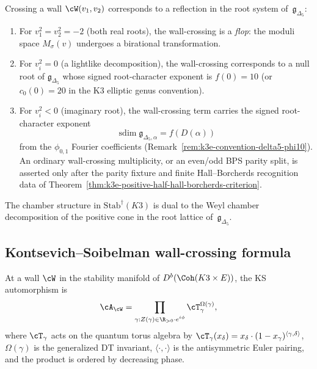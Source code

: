 \begin{proposition}
\label{prop:k3e-walls-roots}
Crossing a wall $\cW(v_1, v_2)$ corresponds to a reflection in the root system of~$\mathfrak{g}_{\Delta_5}$:
\begin{enumerate}[label=(\roman*)]
 \item For $v_1^2 = v_2^2 = -2$ (both real roots), the wall-crossing is a \emph{flop}: the moduli space $M_\sigma(v)$ undergoes a birational transformation.
 \item For $v_i^2 = 0$ (a lightlike decomposition), the wall-crossing corresponds to a null root of $\mathfrak{g}_{\Delta_5}$ whose signed root-character exponent is $f(0) = 10$ (or $c_0(0) = 20$ in the K3 elliptic genus convention).
 \item For $v_i^2 < 0$ (imaginary root), the wall-crossing term carries the signed root-character exponent
\[
\operatorname{sdim}\mathfrak g_{\Delta_5,\alpha}=f(D(\alpha))
\]
from the $\phi_{0,1}$ Fourier coefficients (Remark~\ref{rem:k3e-convention-delta5-phi10}). An ordinary wall-crossing multiplicity, or an even/odd BPS parity split, is asserted only after the parity fixture and finite Hall--Borcherds recognition data of Theorem~\ref{thm:k3e-positive-half-hall-borcherds-criterion}.
\end{enumerate}
The chamber structure in $\mathrm{Stab}^\dagger(K3)$ is dual to the Weyl chamber decomposition of the positive cone in the root lattice of~$\mathfrak{g}_{\Delta_5}$.
\end{proposition}

\subsection{Kontsevich--Soibelman wall-crossing formula}
\label{subsec:k3e-ks-formula}

\begin{theorem}
\label{thm:k3e-ks-wc}
At a wall $\cW$ in the stability manifold of $D^b(\Coh(K3 \times E))$, the KS automorphism is
\[
 \cA_{\cW} = \prod_{\substack{\gamma : Z(\gamma) \in \R_{>0} \cdot e^{i\phi}}} \cT_\gamma^{\Omega(\gamma)},
\]
where $\cT_\gamma$ acts on the quantum torus algebra by $\cT_\gamma(x_\delta) = x_\delta \cdot (1 - x_\gamma)^{\langle \gamma, \delta \rangle}$, $\Omega(\gamma)$ is the generalized DT invariant, $\langle \cdot, \cdot \rangle$ is the antisymmetric Euler pairing, and the product is ordered by decreasing phase.
\end{theorem}

